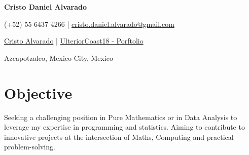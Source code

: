 \documentclass[a4paper,11pt]{article}
\newcommand{\socialicon}[1]{\raisebox{-0.05em}{\resizebox{!}{1em}{#1}}}
\newcommand{\headerfontiii}{\fontfamily{ppl}\selectfont} %
\begin{document}
\headerfontiii

\begin{center}
    {\Huge\textbf{Cristo Daniel Alvarado}}
\end{center}
\vspace{-3mm}

\begin{center}
    \small{
    (+52) 55 6437 4266 | \href{mailto:cristo.daniel.alvarado@gmail.com}{cristo.daniel.alvarado@gmail.com} %
    }
\end{center}
\vspace{-5mm}

\begin{center}
    \small{
    \socialicon{\faLinkedin} \href{www.linkedin.com/in/cristo-daniel-alvarado-2b77a7333}{Cristo Alvarado} | 
    \socialicon{\faGithub} \href{https://github.com/UlteriorCoast18/Portfolio}{UlteriorCoast18 - Porftolio} %
    }
\end{center}
\vspace{-5mm}
\begin{center}
    \small{Azcapotzalco, Mexico City, Mexico}
\end{center}

\vspace{-4mm}

\section{\textbf{Objective}}
\vspace{1mm}
\small{
Seeking a challenging position in Pure Mathematics or in Data Analysis to leverage my expertise in programming and statistics. Aiming to contribute to innovative projects at the intersection of Maths, Computing and practical problem-solving.
}
\vspace{-2mm}
\end{document}
